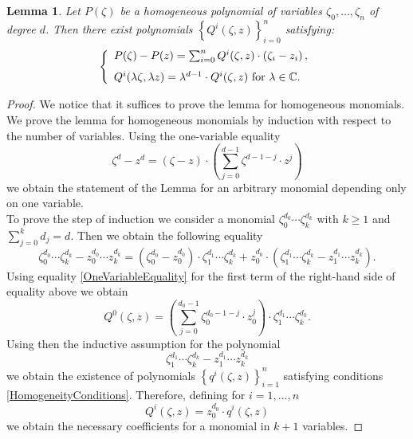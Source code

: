 \documentclass[11pt,reqno]{amsart}
\numberwithin{equation}{section}
\newtheorem{lemma}[proposition]{Lemma}
\begin{document}
\begin{lemma}\label{WeilCoefficients} Let $P(\zeta)$ be a homogeneous polynomial of variables
$\zeta_0,\dots,\zeta_n$ of degree $d$. Then there exist polynomials
$\left\{Q^i(\zeta,z)\right\}_{i=0}^n$ satisfying:
\begin{equation}\label{HomogeneityConditions}
\left\{\begin{array}{ll}
P(\zeta)-P(z)=\sum_{i=0}^nQ^i(\zeta,z)\cdot\left(\zeta_i-z_i\right),\vspace{0.1in}\\
Q^i(\lambda\zeta,\lambda z)=\lambda^{d-1}\cdot Q^i(\zeta,z)\ \mbox{for}\ \lambda\in{{\mathbb C}}.
\end{array}\right.
\end{equation}
\end{lemma}
\begin{proof} We notice that it suffices to prove the lemma for homogeneous monomials.
We prove the lemma for homogeneous monomials by induction with respect to the number
of variables. Using the one-variable equality
\begin{equation}\label{OneVariableEquality}
\zeta^d-z^d=\left(\zeta-z\right)\cdot\left(\sum_{j=0}^{d-1}\zeta^{d-1-j}\cdot z^{j}\right)
\end{equation}
we obtain the statement of the Lemma for an arbitrary monomial depending only on one variable.\\
\indent
To prove the step of induction we consider a monomial $\zeta_0^{d_0}\cdots\zeta_k^{d_k}$ with
$k\geq 1$ and $\sum_{j=0}^k d_j=d$. Then we obtain the following equality
$$\zeta_0^{d_0}\cdots\zeta_k^{d_k}-z_0^{d_0}\cdots z_k^{d_k}
=\left(\zeta_0^{d_0}-z_0^{d_0}\right)\cdot\zeta_1^{d_1}\cdots\zeta_k^{d_k}
+z_0^{d_0}\cdot\left(\zeta_1^{d_1}\cdots\zeta_k^{d_k}
-z_1^{d_1}\cdots z_k^{d_k}\right).$$
\indent
Using equality \eqref{OneVariableEquality} for the first term of the right-hand side
of equality above we obtain
$$Q^0(\zeta,z)=\left(\sum_{j=0}^{d_0-1}\zeta_0^{d_0-1-j}\cdot z_0^{j}\right)
\cdot\zeta_1^{d_1}\cdots\zeta_k^{d_k}.$$
Using then the inductive assumption for the polynomial
$$\zeta_1^{d_1}\cdots\zeta_k^{d_k}-z_1^{d_1}\cdots z_k^{d_k}$$
we obtain the existence of polynomials $\left\{q^i(\zeta,z)\right\}_{i=1}^n$ satisfying
conditions \eqref{HomogeneityConditions}. Therefore, defining for $i=1,\dots,n$
$$Q^i(\zeta,z)=z_0^{d_0}\cdot q^i(\zeta,z)$$
we obtain the necessary coefficients for a monomial in $k+1$ variables.
\end{proof}
\end{document}
